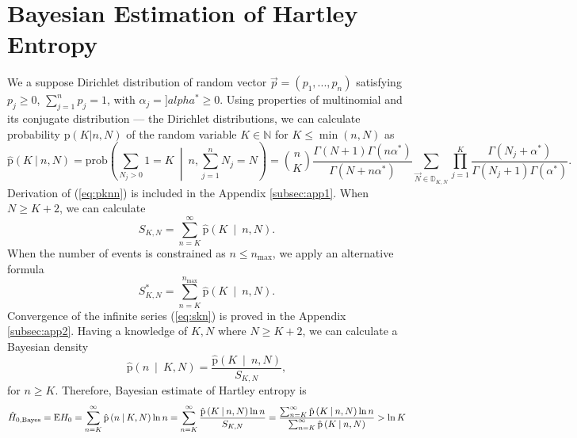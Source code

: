 \section {Bayesian Estimation of Hartley Entropy}
We a suppose Dirichlet distribution of random vector $\vec{p} = (p_{1},...,p_{n})$ satisfying  $p_{j} \ge 0$, $\sum_{j=1}^{n} p_{j} = 1$, with $\alpha_j = ]alpha^{*} \ge 0$. Using properties of multinomial and its conjugate distribution --- the Dirichlet distributions, we can calculate probability $\text{p}(K|n,N)$ of the random variable $K \in \mathbb{N}$ for $K \le \min(n,N)$ as 
\begin{equation} 
\label{eq:pknn}
\mathrm{\hat{p}}(K \: | \: n,N) = \text{prob}\left(\sum_{N_{j} > 0}{1}=K \: \middle| \: n,\sum_{j=1}^{n}{N_{j}}=N\right) = {n \choose K} \frac{\Gamma({N+1}) \Gamma(n\alpha^{*})}{\Gamma(N+n\alpha^{*})} \sum_{\vec{N} \in \mathbb{D}_{K,N}} \prod_{j=1}^{K} \frac{ \Gamma(N_{j} + \alpha^{*})}{ \Gamma(N_j+1) \Gamma(\alpha^{*})}.
\end{equation}
Derivation of (\ref{eq:pknn}) is included in the Appendix \ref{subsec:app1}. When $N \ge K+2$, we can calculate 
\begin{equation} 
\label{eq:skn}
S_{K,N} = \sum_{n=K}^{\infty}{\mathrm{\hat{p}}\left(K \: \middle| \: n,N\right)}.
\end{equation}
When the number of events is constrained as $n \leq n_{\text{max}} $, we apply an alternative formula
\begin{equation} 
\label{eq:sknalt}
S_{K,N}^{*} = \sum_{n=K}^{n_{\text{max}}}{\mathrm{\hat{p}}\left(K \: \middle| \: n,N\right)}.
\end{equation}
Convergence of the infinite series (\ref{eq:skn}) is proved in the Appendix \ref{subsec:app2}. Having a knowledge of $K,N$ where $N \ge K+2$, we can calculate a Bayesian density
\begin{equation} 
\label{eq:pnkn}
\mathrm{\hat{p}}\left(n \: \middle| \: K,N \right) = \frac{\mathrm{\hat{p}}\left(K \: \middle| \: n,N\right)}{S_{K,N}},
\end{equation}
for $n \ge K$.
Therefore, Bayesian estimate of Hartley entropy is
\begin{equation} 
\label{eq:hnbayes}
\hat{H}_{0,\mbox{\scriptsize{Bayes}}} = \text{E}H_{0}  = \sum_{n=K}^{\infty}{\mathrm{\hat{p}}\left(n \: \middle| \: K,N\right)\ln{n}} = \sum_{n=K}^{\infty} \frac{\mathrm{\hat{p}}\left(K \: \middle| \: n,N\right)\ln{n}}{S_{K,N}} =  \frac{ \sum_{n=K}^{\infty} \mathrm{\hat{p}}\left(K \: \middle| \: n,N\right)\ln{n}}{\sum_{n=K}^{\infty} \mathrm{\hat{p}}\left(K \: \middle| \: n,N\right)} > \ln{K}
\end{equation}
